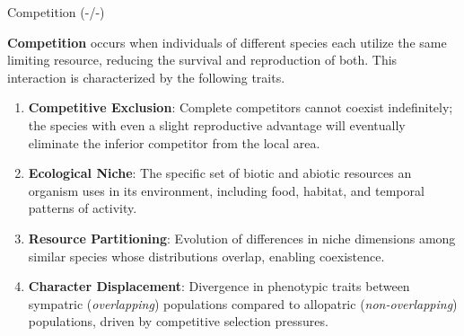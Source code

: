 \documentclass[10pt]{article}
\begin{document}
    \begin{core}{Competition (-/-)}

      \textbf{Competition} occurs when individuals of different species each utilize the same limiting resource, reducing the survival and reproduction of both. This interaction is characterized by the following traits.

      \begin{enumerate}

        \item \textbf{Competitive Exclusion}: Complete competitors cannot coexist indefinitely; the species with even a slight reproductive advantage will eventually eliminate the inferior competitor from the local area.

        \item \textbf{Ecological Niche}: The specific set of biotic and abiotic resources an organism uses in its environment, including food, habitat, and temporal patterns of activity.

        \item \textbf{Resource Partitioning}: Evolution of differences in niche dimensions among similar species whose distributions overlap, enabling coexistence.

        \item \textbf{Character Displacement}: Divergence in phenotypic traits between sympatric (\textit{overlapping}) populations compared to allopatric (\textit{non-overlapping}) populations, driven by competitive selection pressures.

      \end{enumerate}

    \end{core}
\end{document}
